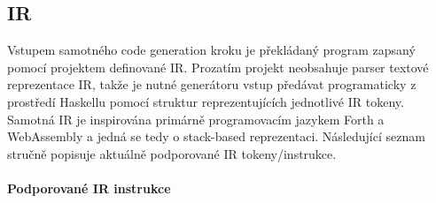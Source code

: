 \documentclass{article}
\begin{document}
\subsection{IR}

Vstupem samotného code generation kroku je překládaný program zapsaný pomocí projektem definované IR. Prozatím projekt neobsahuje parser textové reprezentace IR, takže je nutné generátoru vstup předávat programaticky z prostředí Haskellu pomocí struktur reprezentujících jednotlivé IR tokeny. Samotná IR je inspirována primárně programovacím jazykem Forth a WebAssembly a jedná se tedy o stack-based reprezentaci. Následující seznam stručně popisuje aktuálně podporované IR tokeny/instrukce.

\paragraph{Podporované IR instrukce}
\end{document}
